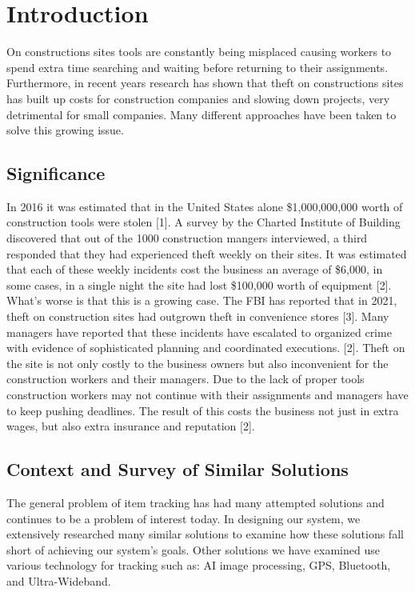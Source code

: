 \documentclass[conference]{IEEEtran}
\begin{document}
\section{Introduction}
On constructions sites tools are constantly being misplaced causing workers to spend extra time searching and waiting before 
returning to their assignments. Furthermore, in recent years research has 
shown that theft on constructions sites has built up costs for construction 
companies and slowing down projects, very detrimental for small companies. 
Many different approaches have been taken to solve this 
growing issue. 

\subsection{Significance}

In 2016 it was estimated that in the United States alone \$1,000,000,000 
worth of construction tools were stolen [1]. A survey by the Charted 
Institute of Building discovered that out of the 1000 construction mangers 
interviewed, a third responded that they had experienced theft weekly on 
their sites. It was estimated that each of these weekly incidents cost the 
business an average of \$6,000, in some cases, in a single night the site 
had lost \$100,000 worth of equipment [2]. What’s worse is that this is a 
growing case. The FBI has reported that in 2021, theft on construction 
sites had outgrown theft in convenience stores [3]. Many managers have 
reported that these incidents have escalated to organized crime with 
evidence of sophisticated planning and coordinated executions. [2]. 
Theft on the site is not only costly to the business owners but also 
inconvenient for the construction workers and their managers. 
Due to the lack of proper tools construction workers may not continue with
their assignments and managers have to keep pushing deadlines. The 
result of this costs the business not just in extra wages, but also 
extra insurance and reputation [2]. 

\subsection{Context and Survey of Similar Solutions}

The general problem of item tracking has had many attempted solutions 
and continues to be a problem of interest today. In designing our system, 
we extensively researched many similar solutions to examine how these 
solutions fall short of achieving our system’s goals. Other solutions 
we have examined use various technology for tracking such as: AI image 
processing, GPS, Bluetooth, and Ultra-Wideband.
\end{document}
